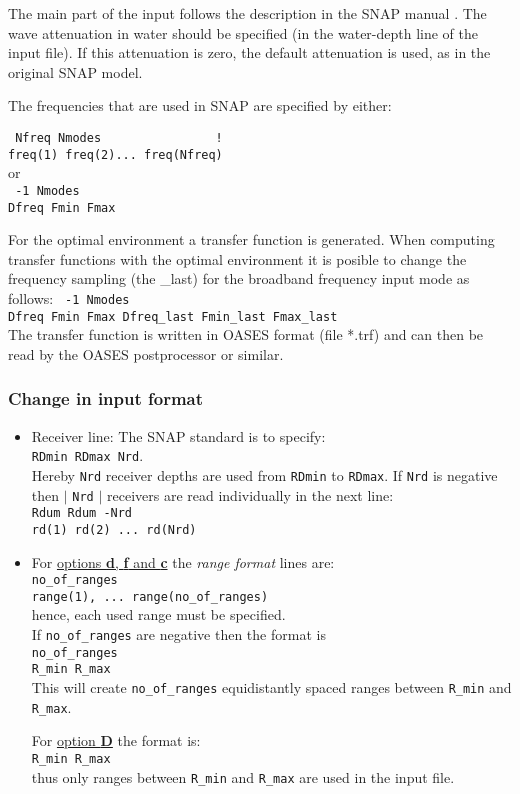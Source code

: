 \documentclass{saclantc}
\begin{document}
The main part of the input follows the description in the {\sf SNAP} manual
\cite{snap}. The wave attenuation in 
water should be specified (in the water-depth line of the input file). 
If this attenuation is zero, the default attenuation
is used, as in the original {\sf SNAP} model.

The frequencies that are used in {\sf SNAP} 
are specified by either:

{\tt
Nfreq  Nmodes~~~~~~~~~~~~~~~     ! \\
freq(1) freq(2)... freq(Nfreq)\\
}
or \\
{\tt
-1  Nmodes\\
Dfreq Fmin Fmax\\
}

For the optimal environment a transfer function is generated. 
When computing transfer functions with the optimal environment
it is posible to change the frequency sampling (the \_last) 
for the broadband frequency input mode as follows:
{\tt
-1  Nmodes\\
Dfreq Fmin Fmax  Dfreq\_last Fmin\_last Fmax\_last\\
}
The transfer function is written in {\sf OASES} format (file *.trf) and can then be read by the  {\sf OASES} postprocessor or similar.


\subsubsection{Change in input format}
\begin{itemize}

\item Receiver line: The {\sf SNAP} standard is to specify: \\
{\tt RDmin RDmax Nrd}.\\
Hereby {\tt  Nrd} receiver depths are used from {\tt RDmin} to {\tt RDmax}.
 If {\tt Nrd} is negative then $\mid$ {\tt Nrd} $\mid$ receivers are 
read individually in the next line:\\
{\tt Rdum Rdum -Nrd} \\
{\tt rd(1) rd(2) ... rd(Nrd) }
\item For \underline{options {\bf d}, {\bf f} and {\bf c}} the {\it
range format} lines are:\\
{\tt no\_of\_ranges}\\
{\tt range(1), ... range(no\_of\_ranges)}\\
hence, each used range must be specified.\\
If {\tt no\_of\_ranges} are negative then the format is \\
{\tt  no\_of\_ranges}\\
{\tt R\_min R\_max}\\
This will create {\tt no\_of\_ranges} equidistantly spaced ranges between {\tt R\_min} and {\tt R\_max}.
 
For \underline{option {\bf D}}
the format is:\\
{\tt R\_min R\_max}\\
thus only ranges between {\tt R\_min} and {\tt R\_max} are used in the
input file. 
\end{itemize}
\end{document}
